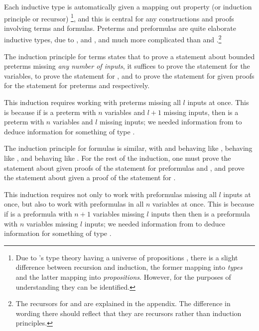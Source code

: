 \begin{rmk}
  Each inductive type is automatically given a mapping out property (or induction principle or recursor)
  \footnote{
    Due to 's type theory having a universe of propositions ,
    there is a slight difference between recursion and induction,
    the former mapping into \textit{types} and the latter mapping into \textit{propositions}.
    However, for the purposes of understanding they can be identified.
  },
  and this is central for any constructions and proofs involving terms and formulas.
  Preterms and preformulas are quite elaborate inductive types,
  due to ,  and ,
  and much more complicated than  and .\footnote{
    The recursors for  and 
    are explained in the appendix.
    The difference in wording there should reflect that they are recursors
    rather than induction principles.
  }

  The induction principle for terms states that to prove a statement about
  bounded preterms missing \textit{any number of inputs},
  it suffices to prove the statement for the variables,
  to prove the statement for ,
  and to prove the statement for  given proofs for the statement
  for preterms  and  respectively.

  This induction requires working with preterms missing all $l$ inputs at once.
  This is because if  is a preterm with $n$ variables and $l + 1$ missing inputs,
  then  is a preterm with $n$ variables and $l$ missing inputs;
  we needed information from  to deduce
  information for something of type .

  The induction principle for formulas is similar,
  with  and  behaving like ,
   behaving like ,
  and  behaving like .
  For the rest of the induction,
  one must prove the statement about  given
  proofs of the statement for preformulas  and ,
  and prove the statement about  given a proof
  of the statement for .

  This induction requires not only to work with preformulas missing all $l$ inputs at once,
  but also to work with preformulas in all $n$ variables at once.
  This is because if  is a preformula with $n + 1$ variables missing $l$ inputs then
  then  is a preformula with $n$ variables missing $l$ inputs;
  we needed information from  to deduce information
  for something of type .

\end{rmk}

